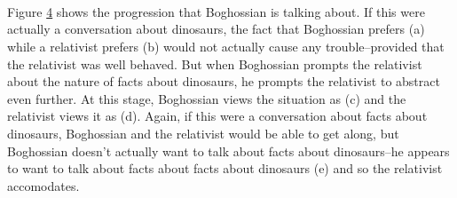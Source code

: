 \documentclass[12pt]{article}
\begin{document}
\begin{flushleft}
\begin{figure}[h]
\begin{subfigure}{.20\linewidth}
        {
        }
        {
            \pline{\bigstar} \\
            \subproof
            {
                \pline{\mathnormal{\alpha}}
            }
            {
            }
        }
        \caption{}
        \label{dinosaur2}
     \end{subfigure}%
    \begin{subfigure}{.20\linewidth}
        \centering
        \fitchctx
        {
            \pline{\bigstar} \\
            \subproof
            {
            }
            {
                \subproof
                {
                    \pline{\mathnormal{\alpha}}
                }
                {
                }
            }
        }
        \caption{}
        \label{dinosaur3}
     \end{subfigure}%
     \begin{subfigure}{.20\linewidth}
        \centering
        \hspace*{2em}%
        \fitchprf
        {
        }
        {
            \pline{\bigstar} \\
            \subproof
            {
            }
            {
                \subproof
                {
                    \pline{\mathnormal{\alpha}}
                }
                {
                }
            }
        }
        \caption{}
        \label{dinosaur4}
    \end{subfigure}
    \caption{}
    \label{dinosaur}
\end{figure}


Figure \ref{dinosaur} shows the progression that Boghossian is talking about.
If this were actually a conversation about dinosaurs, the fact that Boghossian prefers (a) while a relativist prefers (b) would not actually cause any trouble--provided that the relativist was well behaved.
But when Boghossian prompts the relativist about the nature of facts about dinosaurs, he prompts the relativist to abstract even further.
At this stage, Boghossian views the situation as (c) and the relativist views it as (d).
Again, if this were a conversation about facts about dinosaurs, Boghossian and the relativist would be able to get along, but Boghossian doesn't actually want to talk about facts about dinosaurs--he appears to want to talk about facts about facts about dinosaurs (e) and so the relativist accomodates.


\end{flushleft}
\end{document}
